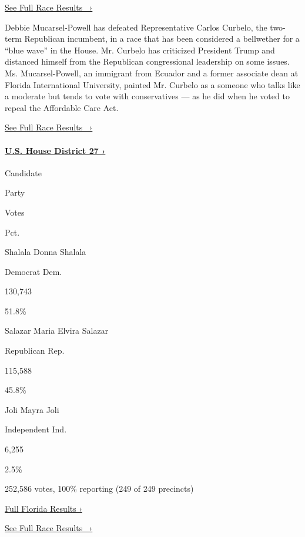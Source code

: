 \href{https://www.nytimes3xbfgragh.onion/elections/results/florida-house-district-26}{See
Full Race Results~ ›}

Debbie Mucarsel-Powell has defeated Representative Carlos Curbelo, the
two-term Republican incumbent, in a race that has been considered a
bellwether for a ``blue wave'' in the House. Mr. Curbelo has criticized
President Trump and distanced himself from the Republican congressional
leadership on some issues. Ms. Mucarsel-Powell, an immigrant from
Ecuador and a former associate dean at Florida International University,
painted Mr. Curbelo as a someone who talks like a moderate but tends to
vote with conservatives --- as he did when he voted to repeal the
Affordable Care Act.

\href{https://www.nytimes3xbfgragh.onion/elections/results/florida-house-district-26}{See
Full Race Results~ ›}

\hypertarget{us-house-district-27-}{%
\paragraph{\texorpdfstring{\href{https://www.nytimes3xbfgragh.onion/elections/results/florida-house-district-27}{U.S.
House District 27
›}}{U.S. House District 27 ›}}\label{us-house-district-27-}}

Candidate

Party

Votes

Pct.

 Shalala Donna Shalala

Democrat Dem.

130,743

51.8\%

 Salazar Maria Elvira Salazar

Republican Rep.

115,588

45.8\%

 Joli Mayra Joli

Independent Ind.

6,255

2.5\%

252,586 votes, 100\% reporting (249 of 249 precincts)

\href{https://www.nytimes3xbfgragh.onion/interactive/2018/11/06/us/elections/results-florida-elections.html}{Full
Florida Results ›}

\href{https://www.nytimes3xbfgragh.onion/elections/results/florida-house-district-27}{See
Full Race Results~ ›}

